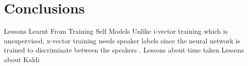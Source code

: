 \chapter{Conclusions}

		Lessons Learnt From Training Self Models
				Unlike i-vector training which is unsupervised, x-vector training needs speaker labels since the neural network is trained to discriminate between the speakers \cite{stafylakis2019self}.
Lessons about time taken
Lessons about Kaldi